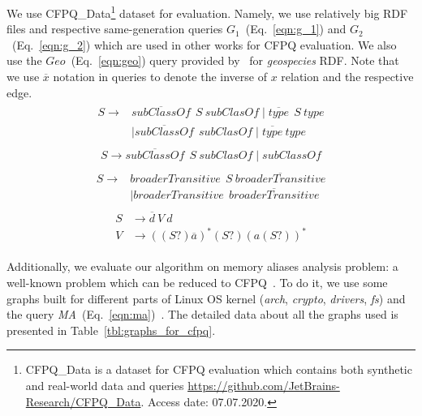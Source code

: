 We use CFPQ\_Data\footnote{CFPQ\_Data is a dataset for CFPQ evaluation which contains both synthetic and real-world data and queries \url{https://github.com/JetBrains-Research/CFPQ\_Data}. Access date: 07.07.2020.} dataset for evaluation.
Namely, we use relatively big RDF files and respective same-generation queries $G_1$~(Eq.~\ref{eqn:g_1}) and $G_2$~(Eq.~\ref{eqn:g_2}) which are used in other works for CFPQ evaluation.
We also use the $Geo$~(Eq.~\ref{eqn:geo}) query provided by~\cite{Kuijpers:2019:ESC:3335783.3335791} for \textit{geospecies} RDF.
Note that we use $\overline{x}$ notation in queries to denote the inverse of $x$ relation and the respective edge.
\begin{align}
\begin{split}
\label{eqn:g_1}
S \to & \overline{\textit{subClassOf}} \ \ S \ \textit{subClasOf} \mid \overline{\textit{type}} \ \ S \ \textit{type}\\   & \mid \overline{\textit{subClassOf}} \ \ \textit{subClasOf} \mid \overline{\textit{type}} \ \textit{type}
\end{split}
\end{align}
\begin{align}
\begin{split}
\label{eqn:g_2}
S \to \overline{\textit{subClassOf}} \ \ S \ \textit{subClasOf} \mid \textit{subClassOf}
\end{split}
\end{align}
\begin{align}
\begin{split}
\label{eqn:geo}
S \to & \textit{broaderTransitive} \ \  S \ \overline{\textit{broaderTransitive}} \\
      & \mid \textit{broaderTransitive} \ \  \overline{\textit{broaderTransitive}}
\end{split}
\end{align}
\begin{align}
\begin{split}
\label{eqn:ma}
S & \to \overline{d} \ V \ d \\
V & \to ((S?) \overline{a})^* (S?) (a (S?))^*
\end{split}
\end{align}

Additionally, we evaluate our algorithm on memory aliases analysis problem: a well-known problem which can be reduced to CFPQ~\cite{Zheng:2008:DAA:1328897.1328464}.
To do it, we use some graphs built for different parts of Linux OS kernel (\textit{arch}, \textit{crypto}, \textit{drivers}, \textit{fs}) and the query \textit{MA}~(Eq.~\ref{eqn:ma})~\cite{10.1145/3093336.3037744}.
The detailed data about all the graphs used is presented in Table~\ref{tbl:graphs_for_cfpq}.


